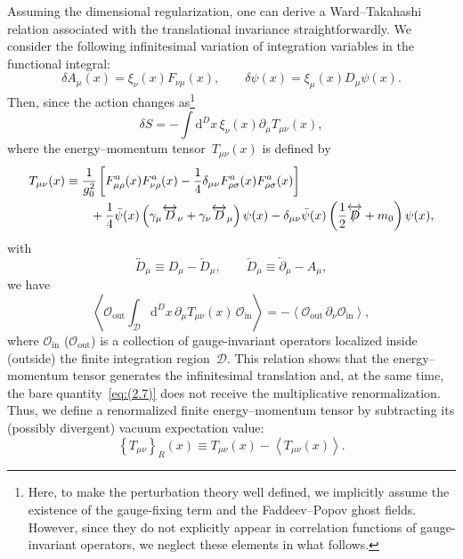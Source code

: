 Assuming the dimensional regularization, one can derive a Ward--Takahashi
relation associated with the translational invariance straightforwardly. We
consider the following infinitesimal variation of integration variables in the
functional integral:
\begin{equation}
   \delta A_\mu(x)=\xi_\nu(x)F_{\nu\mu}(x),\qquad
   \delta\psi(x)=\xi_\mu(x)D_\mu\psi(x).
\label{eq:(2.5)}
\end{equation}
Then, since the action changes as\footnote{Here, to make the perturbation
theory well defined, we implicitly assume the existence of the gauge-fixing
term and the Faddeev--Popov ghost fields. However, since they do not explicitly
appear in correlation functions of gauge-invariant operators, we neglect these
elements in what follows.}
\begin{equation}
   \delta S=-\int\mathrm{d}^Dx\,\xi_\nu(x)\partial_\mu T_{\mu\nu}(x),
\label{eq:(2.6)}
\end{equation}
where the energy--momentum tensor~$T_{\mu\nu}(x)$ is defined by
\begin{align}
   T_{\mu\nu}(x)
   &\equiv\frac{1}{g_0^2}\left[
   F_{\mu\rho}^a(x)F_{\nu\rho}^a(x)
   -\frac{1}{4}\delta_{\mu\nu}F_{\rho\sigma}^a(x)F_{\rho\sigma}^a(x)
   \right]
\notag\\
   &\qquad{}
   +\frac{1}{4}
   \Bar{\psi}(x)\left(\gamma_\mu\overleftrightarrow{D}_\nu
   +\gamma_\nu\overleftrightarrow{D}_\mu\right)\psi(x)
   -\delta_{\mu\nu}\Bar{\psi}(x)
   \left(\frac{1}{2}\overleftrightarrow{\Slash{D}}
   +m_0\right)\psi(x),
\label{eq:(2.7)}
\end{align}
with
\begin{equation}
   \overleftrightarrow{D}_\mu\equiv D_\mu-\overleftarrow{D}_\mu,\qquad
   \overleftarrow{D}_\mu\equiv\overleftarrow{\partial}_\mu-A_\mu,
\label{eq:(2.8)}
\end{equation}
we have
\begin{equation}
   \left\langle\mathcal{O}_{\text{out}}
   \int_{\mathcal{D}}
   \mathrm{d}^Dx\,\partial_\mu T_{\mu\nu}(x)\,\mathcal{O}_{\text{in}}\right\rangle
   =-\left\langle\mathcal{O}_{\text{out}}\,\partial_\nu\mathcal{O}_{\text{in}}
   \right\rangle,
\label{eq:(2.9)}
\end{equation}
where $\mathcal{O}_{\text{in}}$ ($\mathcal{O}_{\text{out}}$) is a collection of
gauge-invariant operators localized inside (outside) the finite integration
region~$\mathcal{D}$. This relation shows that the energy--momentum tensor
generates the infinitesimal translation and, at the same time, the bare
quantity~\eqref{eq:(2.7)} does not receive the multiplicative renormalization.
Thus, we define a renormalized finite energy--momentum tensor by subtracting
its (possibly divergent) vacuum expectation value:
\begin{equation}
   \left\{T_{\mu\nu}\right\}_R(x)
   \equiv T_{\mu\nu}(x)-\left\langle T_{\mu\nu}(x)\right\rangle.
\label{eq:(2.10)}
\end{equation}

